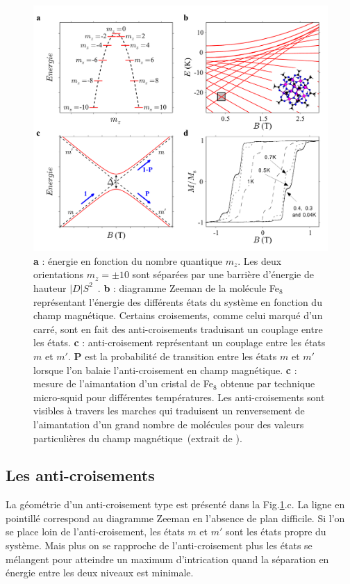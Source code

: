 \begin{figure}
\centering \includegraphics[scale=0.5]{Theorie/MagMol/figure3/figure3.pdf} 
\caption{\textbf{a} : énergie en fonction du nombre quantique $m_z$. Les deux orientations $m_z=\pm 10$ sont séparées par une barrière d'énergie de hauteur $|D|S^2$~\cite{Bogani2008}. \textbf{b} : diagramme Zeeman de la molécule Fe$_8$ représentant l'énergie des différents états du système en fonction du champ magnétique. Certains croisements, comme celui marqué d'un carré, sont en fait des anti-croisements traduisant un couplage entre les états. \textbf{c} : anti-croisement représentant un couplage entre les états $m$ et $m'$. \textbf{P} est la probabilité de transition entre les états $m$ et $m'$ lorsque l'on balaie l'anti-croisement en champ magnétique. \textbf{c} : mesure de l'aimantation d'un cristal de Fe$_8$ obtenue par technique micro-squid pour différentes températures. Les anti-croisements sont visibles à travers les marches qui traduisent un renversement de l'aimantation d'un grand nombre de molécules pour des valeurs particulières du champ magnétique~(extrait de \cite{MagGoesNano}).}
\label{Fe8Zeeman}
\end{figure}

\subsection{Les anti-croisements}
La géométrie d'un anti-croisement type est présenté dans la Fig.\ref{Fe8Zeeman}.c. La ligne en pointillé correspond au diagramme Zeeman en l'absence de plan difficile. Si l'on se place loin de l'anti-croisement, les états $m$ et $m'$ sont les états propre du système. Mais plus on se rapproche de l'anti-croisement plus les états se mélangent pour atteindre un maximum d'intrication quand la séparation en énergie entre les deux niveaux est minimale.

